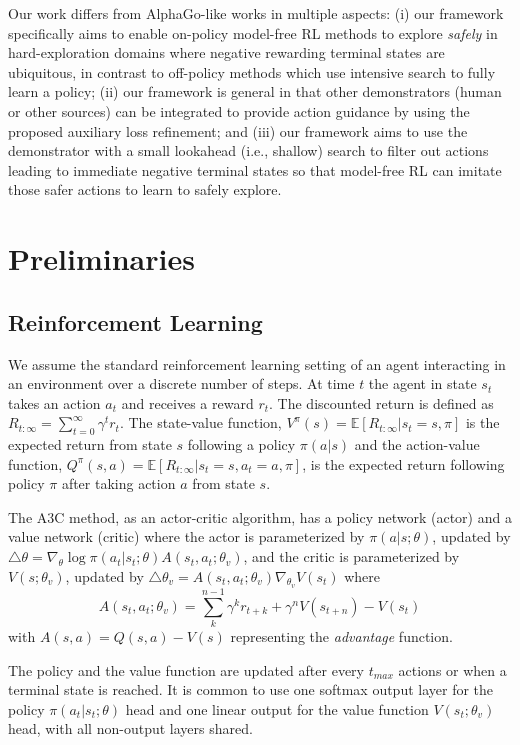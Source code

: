 \documentclass[letterpaper]{article}
\begin{document}
Our work differs from AlphaGo-like works in multiple aspects: (i) our framework specifically aims to enable on-policy model-free RL methods to explore \emph{safely} in hard-exploration domains where negative rewarding terminal states are ubiquitous, in contrast to off-policy methods which use intensive search to fully learn a policy; (ii) our framework is general in that other demonstrators (human or other sources) can be integrated to provide action guidance by using the proposed auxiliary loss refinement; and
(iii) our framework aims to use the demonstrator with a small lookahead (i.e., shallow) search to filter out actions leading to immediate negative terminal states so that model-free RL can imitate those safer actions to learn to safely explore.


\section{Preliminaries}

\subsection{Reinforcement Learning}

We assume the standard reinforcement learning setting of an agent interacting in an environment over a discrete number of steps. At time $t$ the agent in state $s_t$ takes an action $a_t$ and receives a reward $r_t$. The discounted return is defined as $R_{t:\infty} = \sum_{t=0}^\infty \gamma^t r_t$. The state-value function, $V^\pi(s)=\mathbb{E}[R_{t:\infty}|s_t=s,\pi]$ is the expected return from state $s$ following a policy $\pi(a|s)$
and the action-value function, $Q^\pi(s,a)=\mathbb{E}[R_{t:\infty}|s_t=s, a_t=a,\pi]$, is the expected return following policy $\pi$ after taking action $a$ from state $s$.

The A3C method, as an actor-critic algorithm, has a policy network (actor) and a value network (critic) where the actor is parameterized by $\pi(a|s;\theta)$, updated by ${\triangle\theta = \nabla_\theta \log \pi(a_t|s_t; \theta) A(s_t, a_t; \theta_v)}$, and the critic is parameterized by $V(s; \theta_v)$, updated by ${\triangle\theta_v = A(s_t, a_t; \theta_v) \nabla_{\theta_v} V(s_t)}$ where $$A(s_t, a_t; \theta_v) = \sum_k^{n-1} \gamma^kr_{t+k} + \gamma^n V(s_{t+n}) - V (s_t)$$
with $A(s,a)=Q(s,a)-V(s)$ representing the \emph{advantage} function.

The policy and the value function are updated after every $t_{max}$ actions or when a terminal state is reached. It is common to use one softmax output layer for the policy $\pi(a_t|s_t; \theta)$ head and one linear output for the value function $V (s_t; \theta_v)$ head, with all non-output layers shared.
\end{document}
